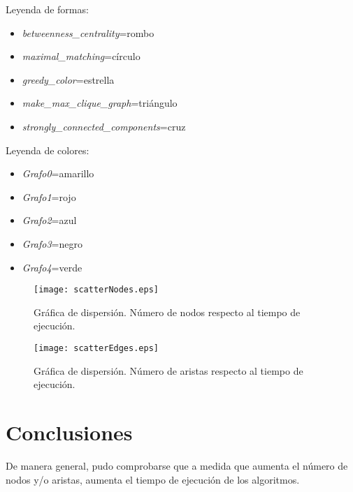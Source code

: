 \documentclass{article}
\begin{document}
Leyenda de formas:
\begin{itemize}
\item \textit{betweenness\_centrality}=rombo
\item \textit{maximal\_matching}=círculo
\item \textit{greedy\_color}=estrella
\item \textit{make\_max\_clique\_graph}=triángulo
\item \textit{strongly\_connected\_components}=cruz
\end{itemize}

Leyenda de colores:
\begin{itemize}
\item \textit{Grafo0}=amarillo
\item \textit{Grafo1}=rojo
\item \textit{Grafo2}=azul
\item \textit{Grafo3}=negro
\item \textit{Grafo4}=verde
\end{itemize}
\begin{figure}
\begin{center}
  \texttt{[image: scatterNodes.eps]}
   \end{center}
   \vspace*{-10mm}
  \caption{Gráfica de dispersión. Número de nodos respecto al tiempo de ejecución.}
  \label{Figura 2} 
\end{figure}

\begin{figure}
\begin{center}
  \texttt{[image: scatterEdges.eps]}
   \end{center}
   \vspace*{-10mm}
  \caption{Gráfica de dispersión. Número de aristas respecto al tiempo de ejecución.}
  \label{Figura 3} 
\end{figure}


\section*{Conclusiones}

De manera general, pudo comprobarse que a medida que aumenta el número de nodos y/o aristas, aumenta el tiempo de ejecución de los algoritmos.





\newpage


\end{document}
